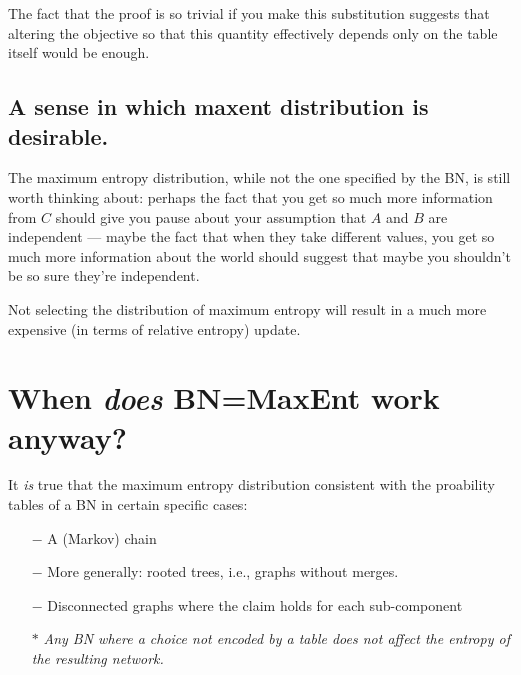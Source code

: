 \documentclass{article}
\begin{document}
	The fact that the proof is so trivial if you make this substitution suggests that altering the objective so that this quantity effectively depends only on the table itself would be enough.
	
	\subsection*{A sense in which maxent distribution is desirable.}
	The maximum entropy distribution, while not the one specified by the BN, is still worth thinking about: perhaps the fact that you get so much more information from $C$ should give you pause about your assumption that $A$ and $B$ are independent --- maybe the fact that when they take different values, you get so much more information about the world should suggest that maybe you shouldn't be so sure they're independent. 
	
	Not selecting the distribution of maximum entropy will result in a much more expensive (in terms of relative entropy) update.
	
	
	\section{When \emph{does} BN=MaxEnt work anyway?} \label{sec:cases-works}
	It \emph{is} true that the maximum entropy distribution consistent with the proability tables of a BN in certain specific cases: 
	
	\begin{itemize}[itemsep=-0.1em]
		\item[$-$] A (Markov) chain
		\item[$-$] More generally: rooted trees, i.e., graphs without merges.
		\item[$-$] Disconnected graphs where the claim holds for each sub-component
		\item[$\boldsymbol\ast$] \textit{Any BN where a choice not encoded by a table does not affect the entropy of the resulting network.}
	\end{itemize}
	
\end{document}
